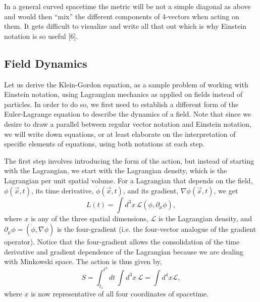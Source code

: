 \documentclass[12pt]{revtex4}
\begin{document}
In a general curved spacetime the metric will be not a simple diagonal as above and would then “mix” the different components of 4-vectors when acting on them. It gets difficult to visualize and write all that out which is why Einstein notation is so useful [6].

\subsection{Field Dynamics} \label{field}
Let us derive the Klein-Gordon equation, as a sample problem of working with Einstein notation, using Lagrangian mechanics as applied on fields instead of particles. In order to do so, we first need to establish a different form of the Euler-Lagrange equation to describe the dynamics of a field.  Note that since we desire to draw a parallel between regular vector notation and Einstein notation, we will write down equations, or at least elaborate on the interpretation of specific elements of equations, using both notations at each step. 

The first step involves introducing the form of the action, but instead of starting with the Lagrangian, we start with the Lagrangian density, which is the Lagrangian per unit spatial volume. For a Lagrangian that depends on the field, $\phi(\vec{x},t)$, its time derivative, $\dot{\phi}(\vec{x},t)$, and its gradient, $\nabla \phi (\vec{x},t)$, we get
\[ L(t)=\int d^3 x \, \mathcal{L}(\phi,\partial_{\mu}\phi),\]
where $x$ is any of the three spatial dimensions, $\mathcal{L}$ is the Lagrangian density, and $\partial_{\mu} \phi = (\dot{\phi},\nabla\phi)$ is the four-gradient (i.e. the four-vector analogue of the gradient operator). Notice that the four-gradient allows the consolidation of the time derivative and gradient dependence of the Lagrangian because we are dealing with Minkowski space. The action is thus given by,
\[ S = \int_{t_1}^{t^2}dt \, \int d^3 x \, \mathcal{L} = \int d^4 x \mathcal{L},\]
where $x$ is now representative of all four coordinates of spacetime.
\end{document}
